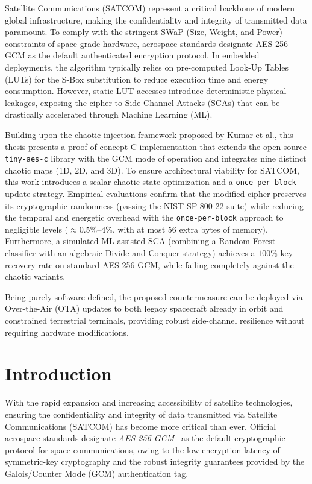 \documentclass[11pt,a4paper]{report}
\begin{document}
Satellite Communications (SATCOM) represent a critical backbone of modern global infrastructure, making the confidentiality and integrity of transmitted data paramount. 
To comply with the stringent SWaP (Size, Weight, and Power) constraints of space-grade hardware, aerospace standards designate AES-256-GCM as the default authenticated encryption protocol. 
In embedded deployments, the algorithm typically relies on pre-computed Look-Up Tables (LUTs) for the S-Box substitution to reduce execution time and energy consumption. 
However, static LUT accesses introduce deterministic physical leakages, exposing the cipher to Side-Channel Attacks (SCAs) that can be drastically accelerated through Machine Learning (ML).

Building upon the chaotic injection framework proposed by Kumar et al., this thesis presents a proof-of-concept C implementation that extends the open-source \texttt{tiny-aes-c} library with the GCM mode of operation and integrates nine distinct chaotic maps (1D, 2D, and 3D). 
To ensure architectural viability for SATCOM, this work introduces a scalar chaotic state optimization and a \texttt{once-per-block} update strategy. 
Empirical evaluations confirm that the modified cipher preserves its cryptographic randomness (passing the NIST SP 800-22 suite) 
while reducing the temporal and energetic overhead with the \texttt{once-per-block} approach to negligible levels ($\approx 0.5\%$--$4\%$, with at most 56 extra bytes of memory). 
Furthermore, a simulated ML-assisted SCA (combining a Random Forest classifier with an algebraic Divide-and-Conquer strategy) achieves a $100\%$ key recovery rate on standard AES-256-GCM, 
while failing completely against the chaotic variants.

Being purely software-defined, the proposed countermeasure can be deployed via Over-the-Air (OTA) updates to both legacy spacecraft already in orbit and constrained terrestrial terminals, 
providing robust side-channel resilience without requiring hardware modifications.


\newpage
\tableofcontents 

\cleardoublepage
{}

\chapter{Introduction}
With the rapid expansion and increasing accessibility of satellite technologies, ensuring the confidentiality and integrity of data transmitted via Satellite Communications (SATCOM) has become more critical than ever. 
Official aerospace standards designate \textit{AES-256-GCM}~\cite{AES256-GCM} as the default cryptographic protocol for space communications, owing to the low encryption latency of symmetric-key cryptography 
and the robust integrity guarantees provided by the Galois/Counter Mode (GCM) authentication tag.
\end{document}

